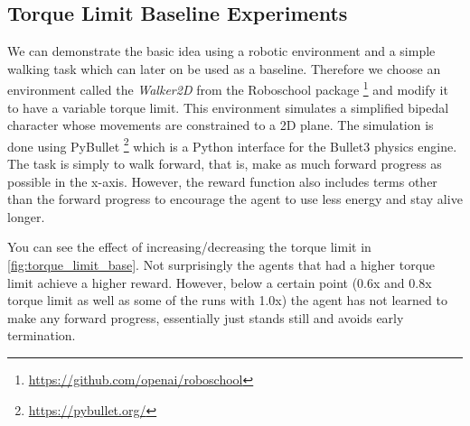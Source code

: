 

\subsection{Torque Limit Baseline Experiments}
We can demonstrate the basic idea using a robotic environment and a simple walking task which can later on be used as a baseline. Therefore we choose an environment called the \textit{Walker2D} from the Roboschool package \footnote{\url{https://github.com/openai/roboschool}} and modify it to have a variable torque limit. This environment simulates a simplified bipedal character whose movements are constrained to a 2D plane. The simulation is done using PyBullet \footnote{\url{https://pybullet.org/}} which is a Python interface for the Bullet3 physics engine. The task is simply to walk forward, that is, make as much forward progress as possible in the x-axis. However, the reward function also includes terms other than the forward progress to encourage the agent to use less energy and stay alive longer.

You can see the effect of increasing/decreasing the torque limit in \autoref{fig:torque_limit_base}. Not surprisingly the agents that had a higher torque limit achieve a higher reward. However, below a certain point (0.6x and 0.8x torque limit as well as some of the runs with 1.0x) the agent has not learned to make any forward progress, essentially just stands still and avoids early termination.

